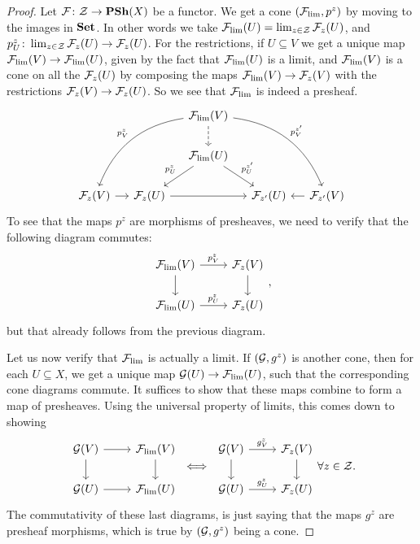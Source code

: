 \documentclass{article}
\begin{document}
\begin{proof}
    Let $\mathcal{F} \colon \mathcal{Z} \to \operatorname{\mathbf{PSh}}(X)$ be a functor. We get a cone $(\mathcal{F}_{\lim}, p^z)$ by
    moving to the images in $\operatorname{\mathbf{Set}}$. In other words we take
    $\mathcal{F}_{\lim} (U) = \lim_{z \in \mathcal{Z}} \mathcal{F}_z(U)$,
    and $p^z_U \colon \lim_{z\in \mathcal{Z}}\mathcal{F}_z(U) \to \mathcal{F}_z(U)$.
    For the restrictions, if $U\subseteq V$ we get a unique map
    $\mathcal{F}_{\lim}(V) \to \mathcal{F}_{\lim}(U)$, given by the fact
    that $\mathcal{F}_{\lim}(U)$ is a limit, and $\mathcal{F}_{\lim}(V)$ is a cone
    on all the $\mathcal{F}_z(U)$ by composing the maps $\mathcal{F}_{\lim}(V) \to \mathcal{F}_z(V)$ with
    the restrictions $\mathcal{F}_z(V) \to \mathcal{F}_z(U)$. So we see that $\mathcal{F}_{\lim}$
    is indeed a presheaf.
    \begin{equation*}
        \begin{tikzcd}[column sep=small]
            &&\mcF_{\lim}(V) \dar[dashed] \ar[ddll, bend right, "p^z_V"'] \ar[ddrr, bend left, "p^{z'}_V"]\\
            &&\mcF_{\lim}(U) \ar[dl, "p^z_U"'] \ar[dr, "p^{z'}_U"]\\
            \mcF_z(V) \rar &\mcF_z(U) \ar[rr] &&\mcF_{z'}(U) &\mcF_{z'}(V) \lar
        \end{tikzcd}
    \end{equation*}
    To see that the maps $p^z$ are morphisms of presheaves, we need
    to verify that the following diagram commutes:
    \begin{equation*}
        \begin{tikzcd}
            \mcF_{\lim}(V) \dar \rar["p^z_V"] & \mcF_z(V) \dar \\
            \mcF_{\lim}(U) \rar["p^z_U"] & \mcF_z(U)
        \end{tikzcd},
    \end{equation*}
    but that already follows from the previous diagram.

    Let us now verify that $\mathcal{F}_{\lim}$ is actually a limit.
    If $(\mathcal{G}, g^z)$ is another cone, then for each $U\subseteq X$,
    we get a unique map $\mathcal{G}(U) \to \mathcal{F}_{\lim}(U)$, such that the
    corresponding cone diagrams commute. It suffices to show that these
    maps combine to form a map of presheaves.
    Using the universal property of limits, this comes down to showing
    \begin{equation*}
        \begin{tikzcd}
            \mcG(V)\rar \dar & \mcF_{\lim}(V) \dar \\
            \mcG(U)\rar & \mcF_{\lim}(U)
        \end{tikzcd}
        \iff
        \begin{tikzcd}
            \mcG(V)\rar["g^z_V"] \dar & \mcF_{z}(V) \dar \\
            \mcG(U)\rar["g^z_U"] & \mcF_{z}(U)
        \end{tikzcd}
        \forall z\in \mcZ.
    \end{equation*}
    The commutativity of these last diagrams, is just saying that the
    maps $g^z$ are presheaf morphisms, which is true by $(\mathcal{G}, g^z)$ being a cone.
\end{proof}
\end{document}

